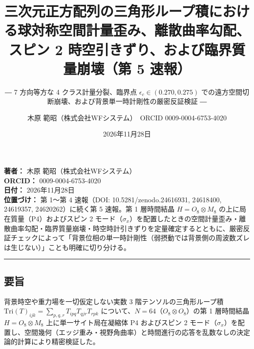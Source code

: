 \documentclass[
  a4paper,
]{ltjsarticle}
\title{三次元正方配列の三角形ループ積における球対称空間計量歪み、離散曲率勾配、スピン
2 時空引きずり、および臨界質量崩壊（第 5 速報）}
\subtitle{― 7 方向等方な 4 クラス計量分裂、臨界点
\(\epsilon_c \in (0.270, 0.275)\)
での遠方空間切断崩壊、および背景単一時計剛性の厳密反証検証 ―}
\author{木原 範昭（株式会社WFシステム）　ORCID 0009-0004-6753-4020}
\date{2026年11月28日}
\begin{document}
\maketitle

\textbf{著者：} 木原 範昭（株式会社WFシステム）\\
\textbf{ORCID：} 0009-0004-6753-4020\\
\textbf{日付：} 2026年11月28日\\
\textbf{位置づけ：} 第 1〜第 4 速報（DOI: 10.5281/zenodo.24616931,
24618400, 24619357, 24620262）に続く第 5 速報。第 1 層時間結晶
\(H = O_8 \otimes M_8\) の上に局在質量（P4）およびスピン 2
モード（\(\sigma_x\)）を配置したときの空間計量歪み・離散曲率勾配・臨界質量崩壊・時空時計引きずりを定量確定するとともに、厳密反証チェックによって「背景位相の単一時計剛性（弱摂動では背景側の周波数ズレは生じない）」ことも明確に切り分ける。

\begin{center}\rule{0.5\linewidth}{0.5pt}\end{center}

\subsection{要旨}\label{ux8981ux65e8}

背景時空や重力場を一切仮定しない実数 3 階テンソルの三角形ループ積
\(\mathrm{Tri}(T)_{ijk} = \sum_{p,q,r} T_{ipq} T_{qjr} T_{rpk}\)
について、\(N = 64\)（\(O_8 \otimes O_8\)）の第 1 層時間結晶
\(H = O_8 \otimes M_8\) 上に単一サイト局在凝縮体 P4 およびスピン 2
モード（\(\sigma_x\)）を配置し、空間幾何（エッジ重み・視野角曲率）と時間進行の応答を乱数なしの決定論的計算により精密検証した。
\end{document}
